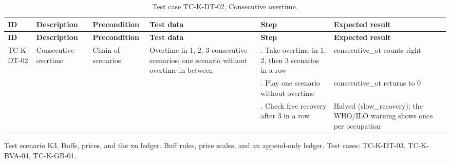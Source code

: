 {\footnotesize{}\renewcommand{\arraystretch}{1.1}
\begin{longtable}{|>{\raggedright\arraybackslash}p{}|>{\raggedright\arraybackslash}p{}|>{\raggedright\arraybackslash}p{}|>{\raggedright\arraybackslash}p{}|>{\raggedright\arraybackslash}p{}|>{\raggedright\arraybackslash}p{}|}
\caption{Test case TC-K-DT-02, Consecutive overtime.} \\
\hline
\textbf{ID} & \textbf{Description} & \textbf{Precondition} & \textbf{Test data} & \textbf{Step} & \textbf{Expected result} \\ \hline
\endfirsthead
\hline
\textbf{ID} & \textbf{Description} & \textbf{Precondition} & \textbf{Test data} & \textbf{Step} & \textbf{Expected result} \\ \hline
\endhead
TC-K-DT-02 & Consecutive overtime & Chain of scenarios & Overtime in 1, 2, 3 consecutive scenarios; one scenario without overtime in between & 1. Take overtime in 1, 2, then 3 scenarios in a row & consecutive\_\allowbreak{}ot counts right \\ \cline{5-6}
 &  &  &  & 2. Play one scenario without overtime & consecutive\_\allowbreak{}ot returns to 0 \\ \cline{5-6}
 &  &  &  & 3. Check free recovery after 3 in a row & Halved (slow\_\allowbreak{}recovery); the WHO/ILO warning shows once per occupation \\ \hline
\end{longtable}
}

Test scenario K3, Buffs, prices, and the xu ledger. Buff rules, price scales, and an append-only ledger. Test cases: TC-K-DT-03, TC-\allowbreak{}K-\allowbreak{}BVA-\allowbreak{}04, TC-K-GB-01.


